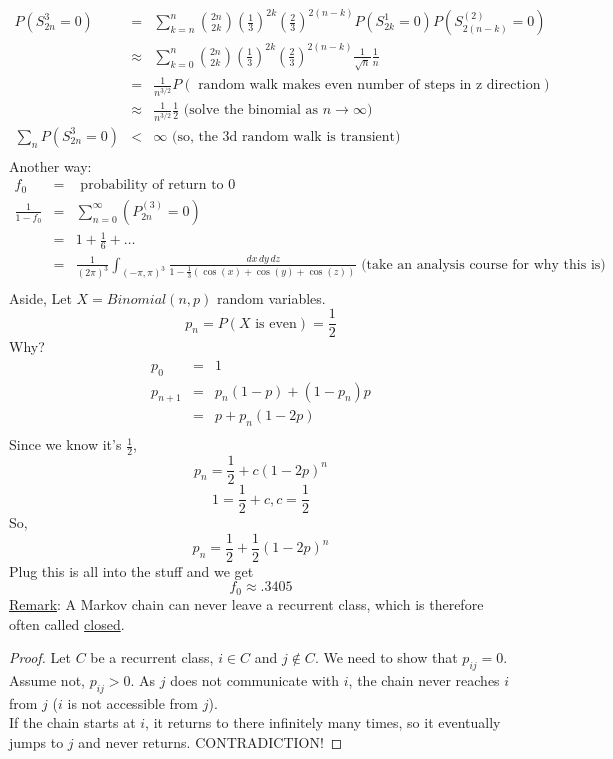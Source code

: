     \begin{eqnarray*}
      P(S_{2n}^{3} = 0) & = & \sum_{k = n}^n \binom{2n}{2k} 
        \left(\frac{1}{3}\right)^{2k} \left(\frac{2}{3}\right)^{2(n-k)} 
        P(S_{2k}^1 = 0)P(S_{2(n-k)}^{(2)} =0 )\\
      & \approx & \sum_{k = 0}^n \binom{2n}{2k} \left(\frac{1}{3}\right)^{2k} 
      \left(\frac{2}{3}\right)^{2(n-k)} \frac{1}{\sqrt{n}} \frac{1}{n}\\
      & = & \frac{1}{n^{3/2}}P(\text{ random walk makes even number of 
        steps in z direction})\\
      & \approx & \frac{1}{n^{3/2}} \frac{1}{2} \text{ (solve the binomial as $n \to \infty$)}\\
      \sum_n P(S_{2n}^{3} = 0) & < & \infty \text{ (so, the 3d random walk is transient)}\\
    \end{eqnarray*}
    Another way:
    \begin{eqnarray*}
      f_0 & = & \text{ probability of return to 0}\\
      \frac{1}{1 - f_0} & = & \sum_{n = 0}^{\infty} (P_{2n}^{(3)} = 0)\\
      & = & 1 + \frac{1}{6} + \ldots\\
      & = & \frac{1}{(2\pi)^3} \int_{(-\pi, \pi)^3} \frac{\,dx\,dy\,dz}{
        1 - \frac{1}{3}(\cos(x) + \cos(y) + \cos(z))} 
        \text{ (take an analysis course for why this is)}\\
    \end{eqnarray*}
    Aside, 
    Let $X = Binomial(n,p)$ random variables.\\
    $$
      p_n = P(X\text{ is even}) = \frac{1}{2}
    $$
    Why?
    \begin{eqnarray*}
      p_0 & = & 1\\
      p_{n + 1} & = & p_n (1 - p) + (1 - p_n) p\\
        & = & p + p_n (1 - 2p)\\
    \end{eqnarray*}
    Since we know it's $\frac{1}{2}$,
    $$
      p_n = \frac{1}{2} + c (1 - 2p)^n 
    $$
    $$
      1 = \frac{1}{2} + c, c = \frac{1}{2}
    $$
    So,
    $$
      p_n = \frac{1}{2} + \frac{1}{2} (1 - 2p)^n
    $$
    Plug this is all into the stuff and we get
    $$
      f_0 \approx .3405
    $$
    \underline{Remark}: A Markov chain can never leave a recurrent class, which is
    therefore often called \underline{closed}. 
    \begin{proof}
      Let $C$ be a recurrent class, $i \in C$ and $j \not\in C$. We need to show that
      $p_{ij} = 0$.\\

      Assume not, $p_{ij} > 0$. As $j$ does not communicate with $i$, the chain
      never reaches $i$ from $j$ ($i$ is not accessible from $j$).\\

      If the chain starts at $i$, it returns to there infinitely many times, so it
      eventually jumps to $j$ and never returns. CONTRADICTION!
    \end{proof}

